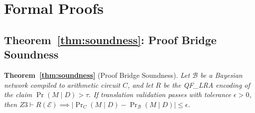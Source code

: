 \documentclass[11pt]{article}
\DeclareMathOperator{\Pr}{Pr}
\begin{document}
\clearpage
\appendix

\section{Formal Proofs}
\label{app:proofs}

\subsection{Theorem~\ref{thm:soundness}: Proof Bridge Soundness}

\noindent\textbf{Theorem~\ref{thm:soundness}} (Proof Bridge Soundness).
\textit{Let $\mathcal{B}$ be a Bayesian network compiled to arithmetic circuit $C$, and let $R$ be the QF\_LRA encoding of the claim $\Pr(M \mid D) > \tau$.
If translation validation passes with tolerance $\epsilon > 0$, then
$Z3 \vdash R(\mathcal{E}) \implies |\Pr_C(M \mid D) - \Pr_{\mathcal{B}}(M \mid D)| \leq \epsilon$.}
\end{document}
